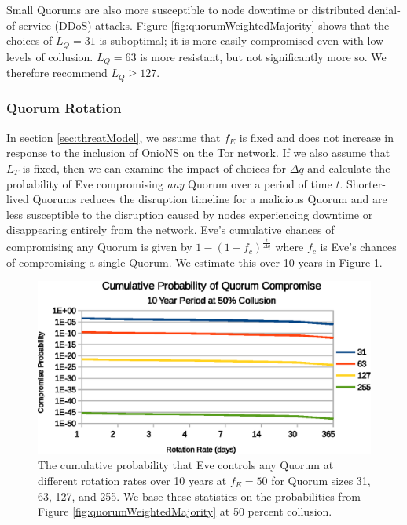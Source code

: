\documentclass[USenglish,oneside,twocolumn]{article}
\begin{document}
Small Quorums are also more susceptible to node downtime or distributed denial-of-service (DDoS) attacks. Figure \ref{fig:quorumWeightedMajority} shows that the choices of $ L_{Q} = 31 $ is suboptimal; it is more easily compromised even with low levels of collusion. $ L_{Q} = 63 $ is more resistant, but not significantly more so. We therefore recommend $ L_{Q} \geq 127 $.

\subsubsection{Quorum Rotation}
\label{sec:qRotation}

In section \ref{sec:threatModel}, we assume that $ f_{E} $ is fixed and does not increase in response to the inclusion of OnioNS on the Tor network. If we also assume that $ L_{T} $ is fixed, then we can examine the impact of choices for $ \Delta q $ and calculate the probability of Eve compromising \emph{any} Quorum over a period of time $ t $. Shorter-lived Quorums reduces the disruption timeline for a malicious Quorum and are less susceptible to the disruption caused by nodes experiencing downtime or disappearing entirely from the network. Eve's cumulative chances of compromising any Quorum is given by $ 1 - (1 - f_{c})^{\frac{t}{\Delta q}} $ where $ f_{c} $ is Eve's chances of compromising a single Quorum. We estimate this over 10 years in Figure \ref{fig:cumulativeProbability}.

\begin{figure}[h]
	\centering
	\includegraphics[width=\linewidth]{../assets/analysis/CumulativeMaliciousQuorumNew.eps}
	\caption{The cumulative probability that Eve controls any Quorum at different rotation rates over 10 years at $ f_{E} = 50 $ for Quorum sizes 31, 63, 127, and 255. We base these statistics on the probabilities from Figure \ref{fig:quorumWeightedMajority} at 50 percent collusion.}
	\label{fig:cumulativeProbability}
\end{figure}
\end{document}
